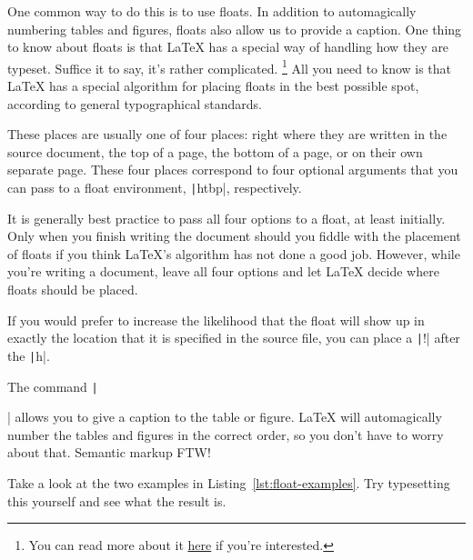 One common way to do this is to use floats.
In addition to automagically numbering tables and figures, floats also allow us to provide a caption.
One thing to know about floats is that \LaTeX{} has a special way of handling how they are typeset.
Suffice it to say, it's rather complicated.%
\footnote{%
You can read more about it \href{http://tex.stackexchange.com/q/39017/32888}{here} if you're interested.%
}
All you need to know is that \LaTeX{} has a special algorithm for placing floats in the best possible spot, according to general typographical standards.

These places are usually one of four places: right where they are written in the source document, the top of a page, the bottom of a page, or on their own separate page.
These four places correspond to four optional arguments that you can pass to a float environment, \texttt|htbp|, respectively.

It is generally best practice to pass all four options to a float, at least initially.
Only when you finish writing the document should you fiddle with the placement of floats if you think \LaTeX's algorithm has not done a good job.
However, while you're writing a document, leave all four options and let \LaTeX{} decide where floats should be placed.

If you would prefer to increase the likelihood that the float will show up in exactly the location that it is specified in the source  file, you can place a \texttt|!| after the \texttt|h|.

The command \texttt|\caption{}| allows you to give a caption to the table or figure.
\LaTeX{} will automagically number the tables and figures in the correct order, so you don't have to worry about that.
Semantic markup FTW!

Take a look at the two examples in Listing~\ref{lst:float-examples}.
Try typesetting this yourself and see what the result is.

